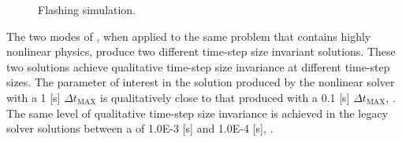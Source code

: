 \begin{figure}[h!t]
\centering
{}
\caption{Flashing simulation.}
\label{fig:flashing_solutions_1}
\end{figure}

The two modes of \cobra{}, when applied to the same problem that contains highly nonlinear physics, produce two different time-step size invariant solutions.
These two solutions achieve qualitative time-step size invariance at different time-step sizes.
The parameter of interest in the solution produced by the nonlinear solver with a 1 [s] $\Delta t_{\text{MAX}}$ is qualitatively close to that produced with a 0.1 [s] $\Delta t_{\text{MAX}}$, .
The same level of qualitative time-step size invariance is achieved in the legacy solver solutions between a \dtmax{} of 1.0E-3 [s] and 1.0E-4 [s], .

